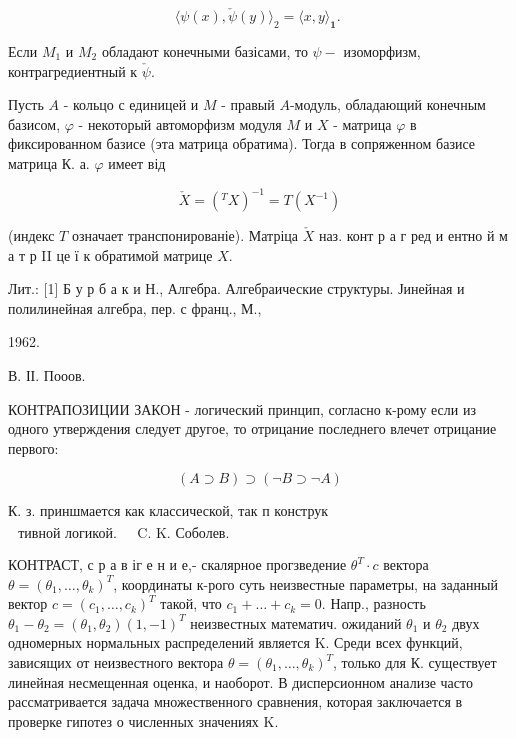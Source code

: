 \documentclass[10pt]{article}
\begin{document}
\[

\langle\psi(x), \check{\psi}(y)\rangle_{2}=\langle x, y\rangle_{\mathbf{1}} \text {. }

\]



Если $M_{1}$ и $M_{2}$ обладают конечными базісами, то $\psi-$ изоморфизм, контрагредиентный к $\check{\psi}$.



Пусть $A$ - кольцо с единицей и $M$ - правый $A$-модуль, обладающий конечным базисом, $\varphi$ - некоторый автоморфизм модуля $M$ и $X$ - матрица $\varphi$ в фиксированном базисе (эта матрица обратима). Тогда в сопряженном базисе матрица К. а. $\varphi$ имеет від



\[

\check{X}=\left({ }^{T} X\right)^{-1}=T\left(X^{-1}\right)

\]



(индекс $T$ означает транспонированіе). Матріца $\check{X}$ наз. конт р а г ред и ентно й м а т р II це ї к обратимой матрице $X$.



Лит.: [1] Б у р б а к и Н., Алгебра. Алгебраические структуры. Јинейная и полилинейная алгебра, пер. с франц., М.,

1962.

В. ІІ. Пооов.



КОНТРАПОЗИЦИИ ЗАКОН - логический принцип, согласно к-рому если из одного утверждения следует другое, то отрицание последнего влечет отрицание первого:



\[

(A \supset B) \supset(\neg B \supset \neg A)

\]



К. з. приншмается как классической, так п конструк$\begin{array}{ll}\text { тивной логикой. } & \text { C. K. Соболев. }\end{array}$



КОНТРАСТ, с р а в іг е н и е,- скалярное прогзведение $\theta^{T} \cdot c$ вектора $\theta=\left(\theta_{1}, \ldots, \theta_{k}\right)^{T}$, координаты к-рого суть неизвестные параметры, на заданный вектор $c=\left(c_{1}, \ldots, c_{k}\right)^{T}$ такой, что $c_{1}+\ldots+c_{k}=0$. Напр., разность $\theta_{1}-\theta_{2}=\left(\theta_{1}, \theta_{2}\right)(1,-1)^{T}$ неизвестных математич. ожиданий $\theta_{1}$ и $\theta_{2}$ двух одномерных нормальных распределений является $\mathrm{K}$. Среди всех функций, зависящих от неизвестного вектора $\theta=\left(\theta_{1}, \ldots, \theta_{k}\right)^{T}$, только для К. существует линейная несмещенная оценка, и наоборот. В дисперсионном анализе часто рассматривается задача множественного сравнения, которая заключается в проверке гипотез о численных значениях $\mathrm{K}$.
\end{document}
